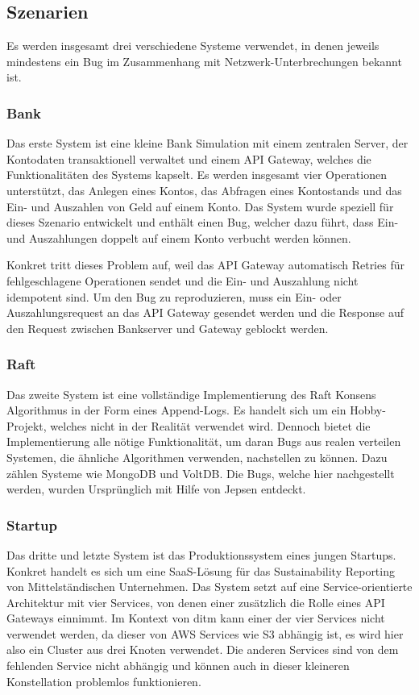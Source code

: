\documentclass[12pt,a4paper]{report}
\begin{document}
\subsection{Szenarien}
Es werden insgesamt drei verschiedene Systeme verwendet, in denen jeweils mindestens ein Bug im Zusammenhang mit
Netzwerk-Unterbrechungen bekannt ist.

\subsubsection{Bank}
Das erste System ist eine kleine Bank Simulation mit einem zentralen Server, der Kontodaten transaktionell verwaltet und einem API
Gateway, welches die Funktionalitäten des Systems kapselt. Es werden insgesamt vier Operationen unterstützt, das Anlegen eines
Kontos, das Abfragen eines Kontostands und das Ein- und Auszahlen von Geld auf einem Konto. Das System wurde speziell für dieses
Szenario entwickelt und enthält einen Bug, welcher dazu führt, dass Ein- und Auszahlungen doppelt auf einem Konto verbucht werden
können.

Konkret tritt dieses Problem auf, weil das API Gateway automatisch Retries für fehlgeschlagene Operationen sendet und die Ein- und
Auszahlung nicht idempotent sind. Um den Bug zu reproduzieren, muss ein Ein- oder Auszahlungsrequest an das API Gateway gesendet
werden und die Response auf den Request zwischen Bankserver und Gateway geblockt werden.

\subsubsection{Raft}
Das zweite System ist eine vollständige Implementierung des Raft Konsens Algorithmus in der Form eines Append-Logs. Es handelt
sich um ein Hobby-Projekt, welches nicht in der Realität verwendet wird. Dennoch bietet die Implementierung alle nötige
Funktionalität, um daran Bugs aus realen verteilen Systemen, die ähnliche Algorithmen verwenden, nachstellen zu können. Dazu
zählen Systeme wie MongoDB und VoltDB. Die Bugs, welche hier nachgestellt werden, wurden Ursprünglich mit Hilfe von Jepsen entdeckt.

\subsubsection{Startup}
Das dritte und letzte System ist das Produktionssystem eines jungen Startups. Konkret handelt es sich um eine SaaS-Lösung für
das Sustainability Reporting von Mittelständischen Unternehmen. Das System setzt auf eine Service-orientierte Architektur mit
vier Services, von denen einer zusätzlich die Rolle eines API Gateways einnimmt. Im Kontext von ditm kann einer der vier Services
nicht verwendet werden, da dieser von AWS Services wie S3 abhängig ist, es wird hier also ein Cluster aus drei Knoten verwendet.
Die anderen Services sind von dem fehlenden Service nicht abhängig und können auch in dieser kleineren Konstellation problemlos
funktionieren.
\end{document}
